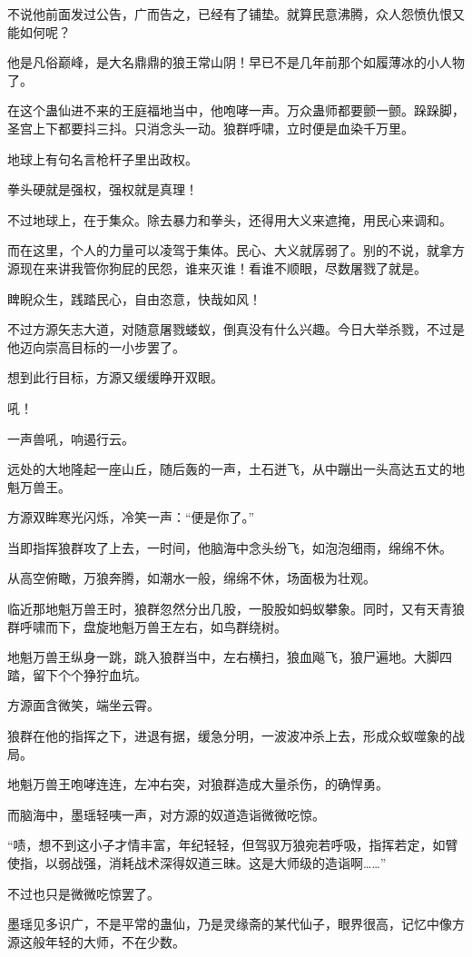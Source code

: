 \begin{this_body}
不说他前面发过公告，广而告之，已经有了铺垫。就算民意沸腾，众人怨愤仇恨又能如何呢？

他是凡俗巅峰，是大名鼎鼎的狼王常山阴！早已不是几年前那个如履薄冰的小人物了。

在这个蛊仙进不来的王庭福地当中，他咆哮一声。万众蛊师都要颤一颤。跺跺脚，圣宫上下都要抖三抖。只消念头一动。狼群呼啸，立时便是血染千万里。

地球上有句名言枪杆子里出政权。

拳头硬就是强权，强权就是真理！

不过地球上，在于集众。除去暴力和拳头，还得用大义来遮掩，用民心来调和。

而在这里，个人的力量可以凌驾于集体。民心、大义就孱弱了。别的不说，就拿方源现在来讲我管你狗屁的民怨，谁来灭谁！看谁不顺眼，尽数屠戮了就是。

睥睨众生，践踏民心，自由恣意，快哉如风！

不过方源矢志大道，对随意屠戮蝼蚁，倒真没有什么兴趣。今日大举杀戮，不过是他迈向崇高目标的一小步罢了。

想到此行目标，方源又缓缓睁开双眼。

吼！

一声兽吼，响遏行云。

远处的大地隆起一座山丘，随后轰的一声，土石迸飞，从中蹦出一头高达五丈的地魁万兽王。

方源双眸寒光闪烁，冷笑一声：“便是你了。”

当即指挥狼群攻了上去，一时间，他脑海中念头纷飞，如泡泡细雨，绵绵不休。

从高空俯瞰，万狼奔腾，如潮水一般，绵绵不休，场面极为壮观。

临近那地魁万兽王时，狼群忽然分出几股，一股股如蚂蚁攀象。同时，又有天青狼群呼啸而下，盘旋地魁万兽王左右，如鸟群绕树。

地魁万兽王纵身一跳，跳入狼群当中，左右横扫，狼血飚飞，狼尸遍地。大脚四踏，留下个个狰狞血坑。

方源面含微笑，端坐云霄。

狼群在他的指挥之下，进退有据，缓急分明，一波波冲杀上去，形成众蚁噬象的战局。

地魁万兽王咆哮连连，左冲右突，对狼群造成大量杀伤，的确悍勇。

而脑海中，墨瑶轻咦一声，对方源的奴道造诣微微吃惊。

“啧，想不到这小子才情丰富，年纪轻轻，但驾驭万狼宛若呼吸，指挥若定，如臂使指，以弱战强，消耗战术深得奴道三昧。这是大师级的造诣啊……”

不过也只是微微吃惊罢了。

墨瑶见多识广，不是平常的蛊仙，乃是灵缘斋的某代仙子，眼界很高，记忆中像方源这般年轻的大师，不在少数。


\end{this_body}
